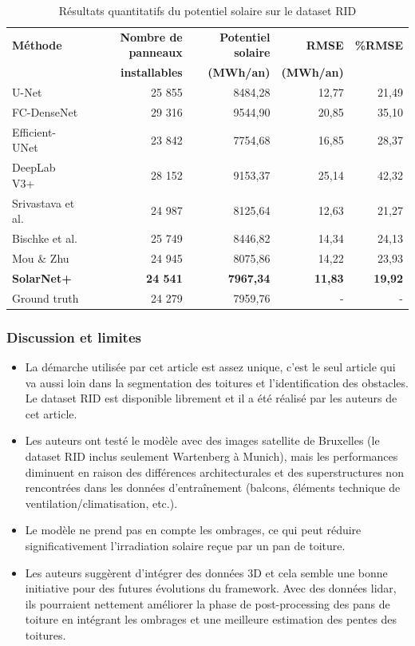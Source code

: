 {{{{\begin{table}[H]
    \centering
    \small
    \begin{tabular}{lrrrr}
        \toprule
        \textbf{Méthode} & \textbf{Nombre de panneaux} & \textbf{Potentiel solaire} & \textbf{RMSE} & \textbf{\%RMSE} \\
        & \textbf{installables} & \textbf{(MWh/an)} & \textbf{(MWh/an)} & \\
        \midrule
        U-Net & 25 855 & 8484,28 & 12,77 & 21,49 \\
        FC-DenseNet & 29 316 & 9544,90 & 20,85 & 35,10 \\
        Efficient-UNet & 23 842 & 7754,68 & 16,85 & 28,37 \\
        DeepLab V3+  & 28 152 & 9153,37 & 25,14 & 42,32 \\
        Srivastava et al. & 24 987 & 8125,64 & 12,63 & 21,27 \\
        Bischke et al. & 25 749 & 8446,82 & 14,34 & 24,13 \\
        Mou \& Zhu & 24 945 & 8075,86 & 14,22 & 23,93 \\
        \textbf{SolarNet+} & \textbf{24 541} & \textbf{7967,34} & \textbf{11,83} & \textbf{19,92} \\
        \midrule
        Ground truth & 24 279 & 7959,76 & - & - \\
        \bottomrule
    \end{tabular}
    \caption{Résultats quantitatifs du potentiel solaire sur le dataset RID \cite{li_deep_2024}}
    \label{tab:solar_net_plus_comparaison_quant}
\end{table}


\subsubsection{Discussion et limites}
\begin{itemize}
    \item La démarche utilisée par cet article est assez unique, c'est le seul article qui va aussi loin dans la segmentation des toitures et l'identification des obstacles. Le dataset RID est disponible librement et il a été réalisé par les auteurs de cet article.
    \item Les auteurs ont testé le modèle avec des images satellite de Bruxelles (le dataset RID inclus seulement Wartenberg à Munich), mais les performances diminuent en raison des différences architecturales et des superstructures non rencontrées dans les données d'entraînement (balcons, éléments technique de ventilation/climatisation, etc.).
    \item Le modèle ne prend pas en compte les ombrages, ce qui peut réduire significativement l'irradiation solaire reçue par un pan de toiture.
    \item Les auteurs suggèrent d'intégrer des données 3D et cela semble une bonne initiative pour des futures évolutions du framework. Avec des données \gls{lidar}, ils pourraient nettement améliorer la phase de post-processing des pans de toiture en intégrant les ombrages et une meilleure estimation des pentes des toitures.
\end{itemize}

}}}}
